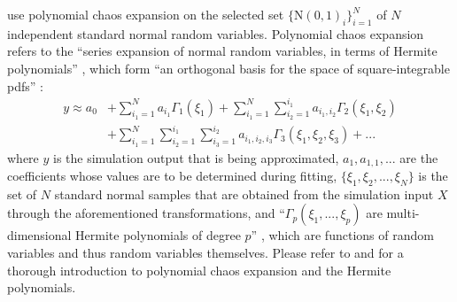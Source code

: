\citeauthor{srsm-phd-1999} use polynomial chaos expansion on the selected set $\{\text{N}(0, 1)_i\}_{i=1}^{N}$ of $N$ independent standard normal random variables. Polynomial chaos expansion \cite{polynomial-chaos-1938} refers to the ``series expansion of normal random variables, in terms of Hermite polynomials'' \cite[p.~44]{srsm-phd-1999}, which form ``an orthogonal basis for the space of square-integrable pdfs'' \cite[p.~44]{srsm-phd-1999}:
\begin{equation} \label{eq:polynomial-chaos}
    \begin{split}
        y \approx a_0 &+ \sum_{i_1 = 1}^{N} a_{i_1} \Gamma_1(\xi_1) + \sum_{i_1 = 1}^{N} \sum_{i_2 = 1}^{i_1} a_{i_1,i_2} \Gamma_2(\xi_1, \xi_2) \\ &+ \sum_{i_1 = 1}^{N} \sum_{i_2 = 1}^{i_1} \sum_{i_3 = 1}^{i_2} a_{i_1,i_2,i_3} \Gamma_3(\xi_1, \xi_2, \xi_3) + ...
    \end{split}
\end{equation}
where $y$ is the simulation output that is being approximated, $a_1, a_{1,1}, ...$ are the coefficients whose values are to be determined during fitting, $\{ \xi_1, \xi_2, ..., \xi_N \}$ is the set of $N$ standard normal samples that are obtained from the simulation input $X$ through the aforementioned transformations, and ``$\Gamma_p(\xi_1, ..., \xi_p)$ are multi-dimensional Hermite polynomials of degree $p$'' \cite[p.~45]{srsm-phd-1999}, which are functions of random variables and thus random variables themselves. Please refer to \textcite{polynomial-chaos-1938} and \textcite{polynomial-chaos-1991} for a thorough introduction to polynomial chaos expansion and the Hermite polynomials.

